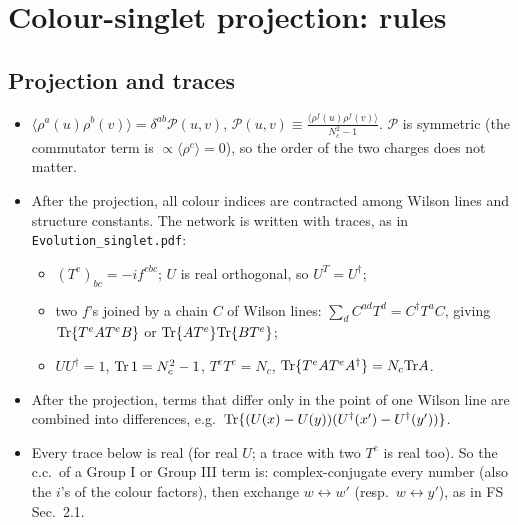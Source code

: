 \documentclass[10pt]{article}
\numberwithin{equation}{section}
\newcommand{\PP}{\mathcal P}
\begin{document}
\section{Colour-singlet projection: rules}\label{sec:rules}
\subsection{Projection and traces}
\begin{itemize}
\item $\langle\rho^a(u)\rho^b(v)\rangle=\delta^{ab}\PP(u,v)$, $\PP(u,v)\equiv\frac{\langle\rho^f(u)\rho^f(v)\rangle}{N_c^2-1}$. $\PP$ is symmetric (the commutator term is $\propto\langle\rho^c\rangle=0$), so the order of the two charges does not matter.
\item After the projection, all colour indices are contracted among Wilson lines and structure constants. The network is written with traces, as in \texttt{Evolution\_singlet.pdf}:
\begin{itemize}
\item $(T^e)_{bc}=-if^{ebc}$; $U$ is real orthogonal, so $U^T=U^\dagger$;
\item two $f$'s joined by a chain $C$ of Wilson lines: $\sum_dC^{ad}T^d=C^\dagger T^aC$, giving ${\rm Tr}\{T^eAT^eB\}$ or ${\rm Tr}\{AT^e\}{\rm Tr}\{BT^e\}$;
\item $UU^\dagger=1$, ${\rm Tr}\,1=N_c^2-1$, $T^eT^e=N_c$, ${\rm Tr}\{T^eAT^eA^\dagger\}=N_c{\rm Tr}A$.
\end{itemize}
\item After the projection, terms that differ only in the point of one Wilson line are combined into differences, e.g.\ ${\rm Tr}\{(U(x)-U(y))(U^\dagger(x')-U^\dagger(y'))\}$.
\item Every trace below is real (for real $U$; a trace with two $T^e$ is real too). So the c.c.\ of a Group I or Group III term is: complex-conjugate every number (also the $i$'s of the colour factors), then exchange $w\leftrightarrow w'$ (resp.\ $w\leftrightarrow y'$), as in FS Sec.~2.1.
\end{itemize}
\end{document}
